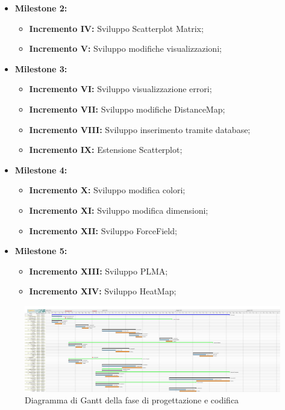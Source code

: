 \documentclass[../piano_di_progetto.tex]{subfiles}
\begin{document}
\begin{itemize}
\begin{itemize}
    \item \textbf{Milestone 2:}
        \begin{itemize}
            \item \textbf{Incremento IV:} Sviluppo Scatterplot Matrix;
            \item \textbf{Incremento V:} Sviluppo modifiche visualizzazioni;
	\end{itemize}
    \item \textbf{Milestone 3:}
        \begin{itemize}
            \item \textbf{Incremento VI:} Sviluppo visualizzazione errori;
            \item \textbf{Incremento VII:} Sviluppo modifiche DistanceMap;
            \item \textbf{Incremento VIII:} Sviluppo inserimento tramite database;
            \item \textbf{Incremento IX:} Estensione Scatterplot;
    \end{itemize}
    \item \textbf{Milestone 4:}
        \begin{itemize}
            \item \textbf{Incremento X:} Sviluppo modifica colori;
            \item \textbf{Incremento XI:} Sviluppo modifica dimensioni;
            \item \textbf{Incremento XII:} Sviluppo ForceField;
    \end{itemize}
    \item \textbf{Milestone 5:}
        \begin{itemize}
            \item \textbf{Incremento XIII:} Sviluppo PLMA;
            \item \textbf{Incremento XIV:} Sviluppo HeatMap;
    \end{itemize}
\end{itemize}
\end{itemize}


\begin{landscape}
    \begin{figure}
    \centering
    \includegraphics[width=1\textwidth, width=200mm, angle=90]{src/img/gantt/documenti_riveduti_RQ.jpg}
    \caption{Diagramma di Gantt della fase di progettazione e codifica}
    \end{figure}
\end{landscape}
\end{document}
